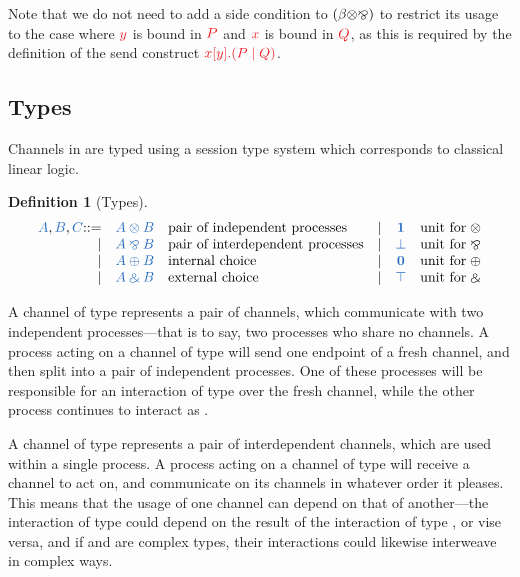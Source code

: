 \documentclass[submission,copyright,creativecommons]{eptcs}
\def\Coloneqq{\mathbin{::=}}
\newtheorem{definition}[lemma]{Definition}
\begin{document}
Note that we do not need to add a side condition to $(\beta{\ensuremath{\otimes}}{\mathbin{\bindnasrepma}})$ to restrict its usage to the case where $\tm{y}$ is bound in $\tm{P}$ and $\tm{x}$ is bound in $\tm{Q}$, as this is required by the definition of the send construct $\tm{\cpSend{x}{y}{P}{Q}}$.

\subsection{Types}
Channels in \cp are typed using a session type system which corresponds to classical linear logic.
\begin{definition}[Types]\label{def:cp-types}
  \[
    \begin{array}{rclrcl}
      \ty{A}, \ty{B}, \ty{C}
           \Coloneqq & \ty{A \tens B} &\text{pair of independent processes}
      &  \mid& \ty{\one}      &\text{unit for} \; {\tens}
      \\ \mid& \ty{A \parr B} &\text{pair of interdependent processes}
      &  \mid& \ty{\bot}      &\text{unit for} \; {\parr}
      \\ \mid& \ty{A \plus B} &\text{internal choice}
      &  \mid& \ty{\nil}      &\text{unit for} \; {\plus}
      \\ \mid& \ty{A \with B} &\text{external choice}
      &  \mid& \ty{\top}      &\text{unit for} \; {\with}
    \end{array}
  \]
\end{definition}\noindent

A channel of type  represents a pair of channels, which communicate with two independent processes---that is to say, two processes who share no channels. A process acting on a channel of type  will send one endpoint of a fresh channel, and then split into a pair of independent processes. One of these processes will be responsible for an interaction of type  over the fresh channel, while the other process continues to interact as .

A channel of type  represents a pair of interdependent channels, which are used within a single process. A process acting on a channel of type  will receive a channel to act on, and communicate on its channels in whatever order it pleases. This means that the usage of one channel can depend on that of another---\eg the interaction of type  could depend on the result of the interaction of type , or vise versa, and if  and  are complex types, their interactions could likewise interweave in complex ways.
\end{document}
